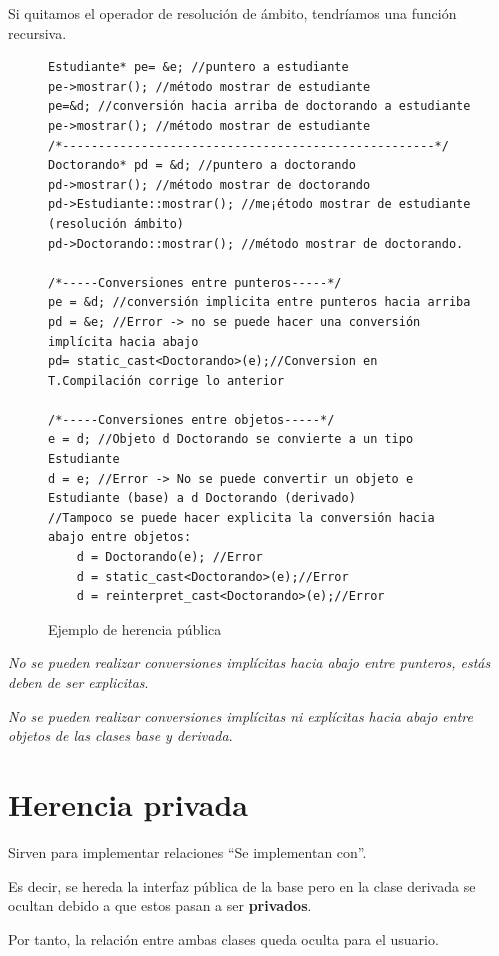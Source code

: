 Si quitamos el operador de resolución de ámbito, tendríamos una función recursiva.\\
\begin{center}
  \begin{figure}[h]
	\begin{lstlisting}[frame=single]
Estudiante* pe= &e; //puntero a estudiante
pe->mostrar(); //método mostrar de estudiante
pe=&d; //conversión hacia arriba de doctorando a estudiante
pe->mostrar(); //método mostrar de estudiante
/*----------------------------------------------------*/
Doctorando* pd = &d; //puntero a doctorando
pd->mostrar(); //método mostrar de doctorando
pd->Estudiante::mostrar(); //me¡étodo mostrar de estudiante (resolución ámbito)
pd->Doctorando::mostrar(); //método mostrar de doctorando.

/*-----Conversiones entre punteros-----*/
pe = &d; //conversión implicita entre punteros hacia arriba
pd = &e; //Error -> no se puede hacer una conversión implícita hacia abajo
pd= static_cast<Doctorando>(e);//Conversion en T.Compilación corrige lo anterior

/*-----Conversiones entre objetos-----*/
e = d; //Objeto d Doctorando se convierte a un tipo Estudiante
d = e; //Error -> No se puede convertir un objeto e Estudiante (base) a d Doctorando (derivado)
//Tampoco se puede hacer explicita la conversión hacia abajo entre objetos:
	d = Doctorando(e); //Error
	d = static_cast<Doctorando>(e);//Error
	d = reinterpret_cast<Doctorando>(e);//Error
	\end{lstlisting}
	\caption{Ejemplo de herencia pública}
	\end{figure}
\end{center}
\textit{No se pueden realizar conversiones implícitas hacia abajo entre punteros, estás deben de ser explicitas}.

\textit{No se pueden realizar conversiones implícitas ni explícitas hacia abajo entre objetos de las clases base y derivada}.
\newpage
\section{Herencia privada}

Sirven para implementar relaciones “Se implementan con”.

Es decir, se hereda la interfaz pública de la base pero en la clase derivada se ocultan debido a que estos pasan a ser \textbf{privados}.

Por tanto, la relación entre ambas clases queda oculta para el usuario.

